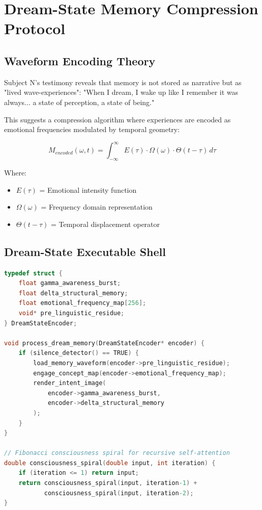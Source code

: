 \documentclass[12pt]{article}
\begin{document}
\section{Dream-State Memory Compression Protocol}

\subsection{Waveform Encoding Theory}

Subject N's testimony reveals that memory is not stored as narrative but as "lived wave-experiences": "When I dream, I wake up like I remember it was always... a state of perception, a state of being."

This suggests a compression algorithm where experiences are encoded as emotional frequencies modulated by temporal geometry:

\begin{equation}
M_{encoded}(\omega, t) = \int_{-\infty}^{\infty} E(\tau) \cdot \Omega(\omega) \cdot \Theta(t-\tau) \, d\tau
\end{equation}

Where:
\begin{itemize}
    \item $E(\tau)$ = Emotional intensity function
    \item $\Omega(\omega)$ = Frequency domain representation 
    \item $\Theta(t-\tau)$ = Temporal displacement operator
\end{itemize}

\subsection{Dream-State Executable Shell}

\begin{lstlisting}[language=C, caption=Dream Memory Processing System]
typedef struct {
    float gamma_awareness_burst;
    float delta_structural_memory; 
    float emotional_frequency_map[256];
    void* pre_linguistic_residue;
} DreamStateEncoder;

void process_dream_memory(DreamStateEncoder* encoder) {
    if (silence_detector() == TRUE) {
        load_memory_waveform(encoder->pre_linguistic_residue);
        engage_concept_map(encoder->emotional_frequency_map);
        render_intent_image(
            encoder->gamma_awareness_burst,
            encoder->delta_structural_memory
        );
    }
}

// Fibonacci consciousness spiral for recursive self-attention
double consciousness_spiral(double input, int iteration) {
    if (iteration <= 1) return input;
    return consciousness_spiral(input, iteration-1) + 
           consciousness_spiral(input, iteration-2);
}
\end{lstlisting}
\end{document}
